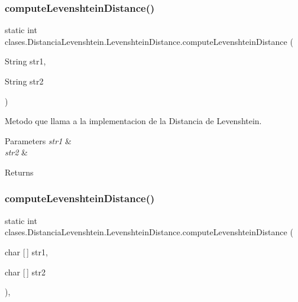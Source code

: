 \subsubsection{\texorpdfstring{compute\+Levenshtein\+Distance()}{computeLevenshteinDistance()}\hspace{0.1cm}{\footnotesize\ttfamily [1/2]}}
{\footnotesize\ttfamily static int clases.\+Distancia\+Levenshtein.\+Levenshtein\+Distance.\+compute\+Levenshtein\+Distance (\begin{DoxyParamCaption}\item[{String}]{str1,  }\item[{String}]{str2 }\end{DoxyParamCaption})\hspace{0.3cm}{\ttfamily [static]}}

Metodo que llama a la implementacion de la Distancia de Levenshtein. 
\begin{DoxyParams}{Parameters}
{\em str1} & \\
\hline
{\em str2} & \\
\hline
\end{DoxyParams}
\begin{DoxyReturn}{Returns}

\end{DoxyReturn}
\hypertarget{classclases_1_1_distancia_levenshtein_1_1_levenshtein_distance_a5391113c57cf7ac23d8d7ab745a7e979}{}\label{classclases_1_1_distancia_levenshtein_1_1_levenshtein_distance_a5391113c57cf7ac23d8d7ab745a7e979} 
\subsubsection{\texorpdfstring{compute\+Levenshtein\+Distance()}{computeLevenshteinDistance()}\hspace{0.1cm}{\footnotesize\ttfamily [2/2]}}
{\footnotesize\ttfamily static int clases.\+Distancia\+Levenshtein.\+Levenshtein\+Distance.\+compute\+Levenshtein\+Distance (\begin{DoxyParamCaption}\item[{char \mbox{[}$\,$\mbox{]}}]{str1,  }\item[{char \mbox{[}$\,$\mbox{]}}]{str2 }\end{DoxyParamCaption})\hspace{0.3cm}{\ttfamily [static]}, {\ttfamily [private]}}

